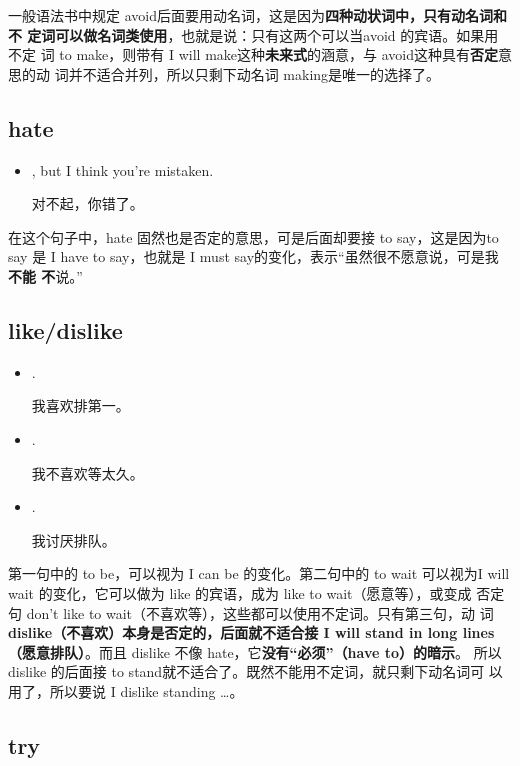 一般语法书中规定 avoid后面要用动名词，这是因为\textbf{四种动状词中，只有动名词和不
  定词可以做名词类使用}，也就是说：只有这两个可以当avoid 的宾语。如果用不定
词 to make，则带有 I will make这种\textbf{未来式}的涵意，与 avoid这种具有\textbf{否定}意思的动
词并不适合并列，所以只剩下动名词 making是唯一的选择了。

\subsection{hate}

\begin{itemize}
\item  {}  , but I think you're
  mistaken.

  对不起，你错了。
\end{itemize}

在这个句子中，hate 固然也是否定的意思，可是后面却要接 to say，这是因为to say
是 I have to say，也就是 I must say的变化，表示“虽然很不愿意说，可是我\textbf{不能
  不}说。”

\subsection{like/dislike}

\begin{itemize}
\item {}  .

  我喜欢排第一。
\item {}  .

  我不喜欢等太久。
\item {}  .

  我讨厌排队。
\end{itemize}

第一句中的 to be，可以视为 I can be 的变化。第二句中的 to wait 可以视为I
will wait 的变化，它可以做为 like 的宾语，成为 like to wait（愿意等），或变成
否定句 don't like to wait（不喜欢等），这些都可以使用不定词。只有第三句，动
词\textbf{dislike（不喜欢）本身是否定的，后面就不适合接 I will stand in long
  lines（愿意排队）}。而且 dislike 不像 hate，它\textbf{没有“必须”（have to）的暗示}。
所以 dislike 的后面接 to stand就不适合了。既然不能用不定词，就只剩下动名词可
以用了，所以要说 I dislike standing \ldots。

\subsection{try}

